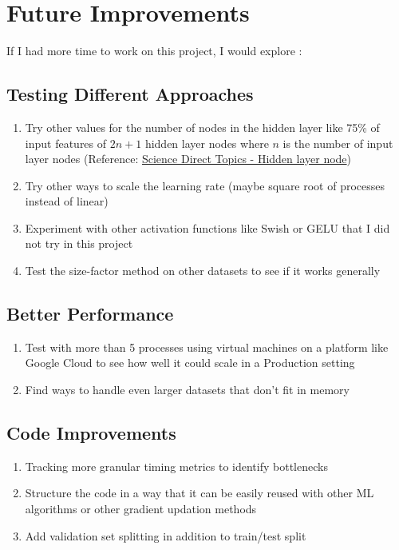 \documentclass{article}
\begin{document}
\section{Future Improvements}

If I had more time to work on this project, I would explore :

\subsection{Testing Different Approaches}
\begin{enumerate}
    \item Try other values for the number of nodes in the hidden layer like 75\% of input features of $2n+1$ hidden layer nodes where $n$ is the number of input layer nodes (Reference: \href{https://www.sciencedirect.com/topics/engineering/hidden-layer-node}{Science Direct Topics - Hidden layer node})
    \item Try other ways to scale the learning rate (maybe square root of processes instead of linear)
    \item Experiment with other activation functions like Swish or GELU that I did not try in this project
    \item Test the size-factor method on other datasets to see if it works generally
\end{enumerate}

\subsection{Better Performance}
\begin{enumerate}
    \item Test with more than 5 processes using virtual machines on a platform like Google Cloud to see how well it could scale in a Production setting
    \item Find ways to handle even larger datasets that don't fit in memory
\end{enumerate}

\subsection{Code Improvements}
\begin{enumerate}
    \item Tracking more granular timing metrics to identify bottlenecks
    \item Structure the code in a way that it can be easily reused with other ML algorithms or other gradient updation methods
    \item Add validation set splitting in addition to train/test split
\end{enumerate}
\end{document}
